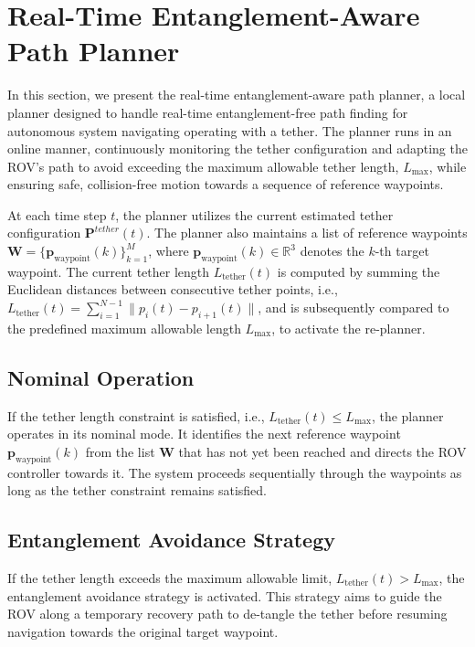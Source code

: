 





\section{Real-Time Entanglement-Aware Path Planner}
\label{sec:planner}

In this section, we present the real-time entanglement-aware path planner, a local planner designed to handle real-time entanglement-free path finding for autonomous system navigating operating with a tether. The planner runs in an online manner, continuously monitoring the tether configuration and adapting the \ac{ROV}'s path to avoid exceeding the maximum allowable tether length, \( L_{\text{max}} \), while ensuring safe, collision-free motion towards a sequence of reference waypoints.

At each time step \( t \), the planner utilizes the current estimated tether configuration  $\mathbf{P}^{tether}(t)$. The planner also maintains a list of reference waypoints \( \mathbf{W} = \{\mathbf{p}_{\text{waypoint}}(k)\}_{k=1}^{M} \), where \( \mathbf{p}_{\text{waypoint}}(k) \in \mathbb{R}^3 \) denotes the \( k \)-th target waypoint. The current tether length \( L_{\text{tether}}(t) \) is computed by summing the Euclidean distances between consecutive tether points, i.e., \( L_{\text{tether}}(t) = \sum_{i=1}^{N-1} \| p_i(t) - p_{i+1}(t) \| \), and is subsequently compared to the predefined maximum allowable length \( L_{\text{max}} \), to activate the re-planner.

\subsection{Nominal Operation}
If the tether length constraint is satisfied, i.e., \( L_{\text{tether}}(t) \leq L_{\text{max}} \), the planner operates in its nominal mode. It identifies the next reference waypoint \( \mathbf{p}_{\text{waypoint}}(k) \) from the list \( \mathbf{W} \) that has not yet been reached and directs the \ac{ROV} controller towards it. The system proceeds sequentially through the waypoints as long as the tether constraint remains satisfied.



\subsection{Entanglement Avoidance Strategy}
If the tether length exceeds the maximum allowable limit, \( L_{\text{tether}}(t) > L_{\text{max}} \), the entanglement avoidance strategy is activated. This strategy aims to guide the \ac{ROV} along a temporary recovery path to de-tangle the tether before resuming navigation towards the original target waypoint.

